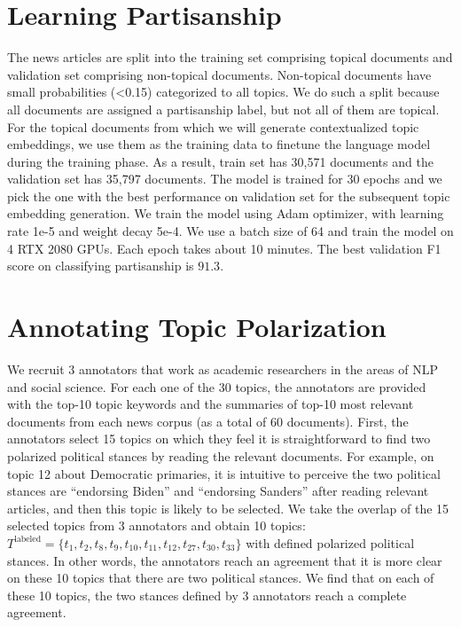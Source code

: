 \documentclass[11pt]{article}
\begin{document}
\section{Learning Partisanship}
The news articles are split into the training set comprising topical documents and validation set comprising non-topical documents. 
Non-topical documents have small probabilities (<0.15) categorized to all topics. We do such a split because all documents are assigned a partisanship label, but not all of them are topical. For the topical documents from which we will generate contextualized topic embeddings, we use them as the training data to finetune the language model during the training phase. As a result, train set has 30,571 documents and the validation set has 35,797 documents. The model is trained for $30$ epochs and we pick the one with the best performance on validation set for the subsequent topic embedding generation. We train the model using Adam optimizer, with learning rate 1e-5 and weight decay 5e-4. We use a batch size of 64 and train the model on 4 RTX 2080 GPUs. Each epoch takes about 10 minutes. The best validation F1 score on classifying partisanship is $91.3$. 

\section{Annotating Topic Polarization}
We recruit 3 annotators that work as academic researchers in the areas of NLP and social science. For each one of the 30 topics, the annotators are provided with the top-10 topic keywords and the summaries of top-10 most relevant documents from each news corpus (as a total of 60 documents). First, the annotators select 15 topics on which they feel it is straightforward to find two polarized political stances by reading the relevant documents. For example, on topic 12 about Democratic primaries, it is intuitive to perceive the two political stances are ``endorsing Biden'' and ``endorsing Sanders'' after reading relevant articles, and then this topic is likely to be selected. We take the overlap of the 15 selected topics from 3 annotators and obtain 10 topics: $T^{\text{labeled}}=\{t_1,t_2,t_8,t_9,t_{10},t_{11},t_{12},t_{27},t_{30},t_{33}\}$ with defined polarized political stances. In other words, the annotators reach an agreement that it is more clear on these 10 topics that there are two political stances. We find that on each of these 10 topics, the two stances defined by 3 annotators reach a complete agreement.
\end{document}
